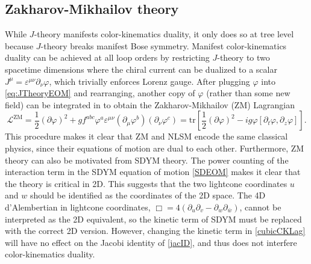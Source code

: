 \documentclass[11pt,letter]{article}
\begin{document}
\subsection{Zakharov-Mikhailov theory}
\label{sec:ZMTheory}
While $J$-theory manifests color-kinematics duality, it only does so at
tree level because $J$-theory breaks manifest Bose symmetry.  Manifest
color-kinematics duality can be achieved at all loop orders by
restricting $J$-theory to two spacetime dimensions where the chiral
current can be dualized to a scalar
$J^\mu = \varepsilon^{\mu\nu} \partial_\nu \varphi$, which trivially
enforces Lorenz gauge.  After plugging $\varphi$ into
\cref{eq:JTheoryEOM} and rearranging, another copy of $\varphi$
(rather than some new field) can be integrated in to obtain the
Zakharov-Mikhailov (ZM) Lagrangian
\begin{equation}
\label{eq:ZMLagrangian}
\mathcal{L}^{\text{ZM}} = \frac{1}{2}(\partial \varphi)^2 + g f^{abc} \varphi^a \varepsilon^{\mu\nu}(\partial_\mu \varphi^b)( \partial_\nu \varphi^c) =  \text{tr}\left[\frac{1}{2}(\partial \varphi)^2-i g \varphi [\partial_t \varphi, \partial_z \varphi ]\right] .
\end{equation}
This procedure makes it clear that ZM and NLSM encode the same
classical physics, since their equations of motion are dual to each
other.  Furthermore, ZM theory can also be motivated from SDYM theory.
The power counting of the interaction term in the SDYM equation of
motion \cref{SDEOM} makes it clear that the theory is critical in 2D.
This suggests that the two lightcone coordinates $u$ and $w$ should be
identified as the coordinates of the 2D space.  The 4D d'Alembertian
in lightcone coordinates,
$\Box = 4 (\partial_u \partial_v - \partial_w \partial_{\bar{w}})$,
cannot be interpreted as the 2D equivalent, so the kinetic term of
SDYM must be replaced with the correct 2D version. However, changing the kinetic term in \cref{cubicCKLag} will have no effect on the Jacobi identity of \cref{jacID}, and thus does not interfere color-kinematics duality. 
\end{document}
